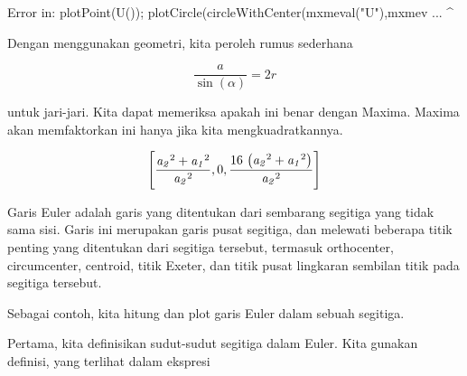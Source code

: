 \documentclass[a4paper,10pt]{article}
\begin{document}
\begin{eulernotebook}
\begin{eulercomment}
\begin{eulercomment}
\begin{eulercomment}
\begin{eulercomment}
\begin{eulercomment}
\begin{eulercomment}
\begin{eulercomment}
\begin{eulercomment}
\begin{eulercomment}
\begin{eulercomment}
\begin{eulercomment}
\begin{eulercomment}
\begin{eulercomment}
\begin{eulercomment}
\begin{eulercomment}
\begin{eulercomment}
\begin{eulercomment}
\begin{eulercomment}
\begin{eulercomment}
\begin{eulercomment}
\begin{eulercomment}
\begin{eulercomment}
\begin{eulercomment}
\begin{eulercomment}
\begin{eulercomment}
\begin{eulercomment}
\begin{eulercomment}
\begin{eulercomment}
\begin{eulercomment}
\begin{eulercomment}
\begin{eulercomment}
\begin{eulercomment}
\begin{eulercomment}
\begin{eulercomment}
\begin{eulercomment}
\begin{eulercomment}
\begin{eulercomment}
\begin{eulercomment}
\begin{eulercomment}
\begin{eulercomment}
\begin{eulercomment}
\begin{eulercomment}
\begin{eulercomment}
\begin{eulercomment}
\begin{eulercomment}
\begin{eulercomment}
\begin{eulercomment}
\begin{eulercomment}
\begin{eulercomment}
\begin{eulercomment}
\begin{eulercomment}
\begin{eulercomment}
\begin{eulercomment}
\begin{eulercomment}
\begin{eulercomment}
\begin{eulercomment}
\begin{eulercomment}
\begin{eulercomment}
\begin{eulercomment}
\begin{eulercomment}
\begin{eulercomment}
\begin{eulercomment}
\begin{euleroutput}
[a/2,(a2^2+a1^2-a*a1)/(2*a2)]
  Error in:
  plotPoint(U()); plotCircle(circleWithCenter(mxmeval("U"),mxmev ...
               ^
\end{euleroutput}
\begin{eulercomment}
Dengan menggunakan geometri, kita peroleh rumus sederhana

\end{eulercomment}
\begin{eulerformula}
\[
\frac{a}{\sin(\alpha)}=2r
\]
\end{eulerformula}
\begin{eulercomment}
untuk jari-jari. Kita dapat memeriksa apakah ini benar dengan Maxima.
Maxima akan memfaktorkan ini hanya jika kita mengkuadratkannya.
\end{eulercomment}
\begin{eulerformula}
\[
\left[ \frac{{\it a_2}^2+{\it a_1}^2}{{\it a_2}^2} , 0 , \frac{16\,
 \left({\it a_2}^2+{\it a_1}^2\right)}{{\it a_2}^2} \right] 
\]
\end{eulerformula}
\begin{eulercomment}
Garis Euler adalah garis yang ditentukan dari sembarang segitiga yang
tidak sama sisi. Garis ini merupakan garis pusat segitiga, dan
melewati beberapa titik penting yang ditentukan dari segitiga
tersebut, termasuk orthocenter, circumcenter, centroid, titik Exeter,
dan titik pusat lingkaran sembilan titik pada segitiga tersebut.

Sebagai contoh, kita hitung dan plot garis Euler dalam sebuah
segitiga.

Pertama, kita definisikan sudut-sudut segitiga dalam Euler. Kita
gunakan definisi, yang terlihat dalam ekspresi 
\end{eulercomment}
\end{eulercomment}
\end{eulercomment}
\end{eulercomment}
\end{eulercomment}
\end{eulercomment}
\end{eulercomment}
\end{eulercomment}
\end{eulercomment}
\end{eulercomment}
\end{eulercomment}
\end{eulercomment}
\end{eulercomment}
\end{eulercomment}
\end{eulercomment}
\end{eulercomment}
\end{eulercomment}
\end{eulercomment}
\end{eulercomment}
\end{eulercomment}
\end{eulercomment}
\end{eulercomment}
\end{eulercomment}
\end{eulercomment}
\end{eulercomment}
\end{eulercomment}
\end{eulercomment}
\end{eulercomment}
\end{eulercomment}
\end{eulercomment}
\end{eulercomment}
\end{eulercomment}
\end{eulercomment}
\end{eulercomment}
\end{eulercomment}
\end{eulercomment}
\end{eulercomment}
\end{eulercomment}
\end{eulercomment}
\end{eulercomment}
\end{eulercomment}
\end{eulercomment}
\end{eulercomment}
\end{eulercomment}
\end{eulercomment}
\end{eulercomment}
\end{eulercomment}
\end{eulercomment}
\end{eulercomment}
\end{eulercomment}
\end{eulercomment}
\end{eulercomment}
\end{eulercomment}
\end{eulercomment}
\end{eulercomment}
\end{eulercomment}
\end{eulercomment}
\end{eulercomment}
\end{eulercomment}
\end{eulercomment}
\end{eulercomment}
\end{eulercomment}
\end{eulercomment}
\end{eulernotebook}
\end{document}
